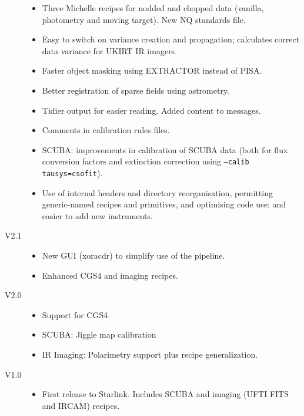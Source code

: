 \documentclass[twoside,11pt]{article}
\renewcommand{\_}{\texttt{\symbol{95}}}
\begin{document}
\begin{description}
\begin{itemize}
\item Three Michelle recipes for nodded and chopped data (vanilla,
  photometry and moving target).  New NQ standards file.

\item Easy to switch on variance creation and propagation; calculates
  correct data variance for UKIRT IR imagers.

\item  Faster object masking using EXTRACTOR instead of PISA.

\item Better registration of sparse fields using astrometry.

\item Tidier output for easier reading.  Added content to messages.

\item Comments in calibration rules files.

\item SCUBA: improvements in calibration of SCUBA data (both for flux
    conversion factors and extinction correction using
     \texttt{--calib tausys=csofit}).

\item Use of internal headers and directory reorganisation, permitting
     generic-named recipes and primitives, and optimising code use;
     and easier to add new instruments.

\end{itemize}

\item[V2.1]

\begin{itemize}

\item New GUI (xoracdr) to simplify use of the pipeline.

\item Enhanced CGS4 and imaging recipes.

\end{itemize}

\item[V2.0]

\begin{itemize}

\item Support for CGS4

\item SCUBA: Jiggle map calibration

\item IR Imaging: Polarimetry support plus recipe generalization.

\end{itemize}

\item[V1.0]

\begin{itemize}

\item First release to Starlink. Includes SCUBA and imaging (UFTI FITS
and IRCAM) recipes.

\end{itemize}

\end{description}
\end{document}
